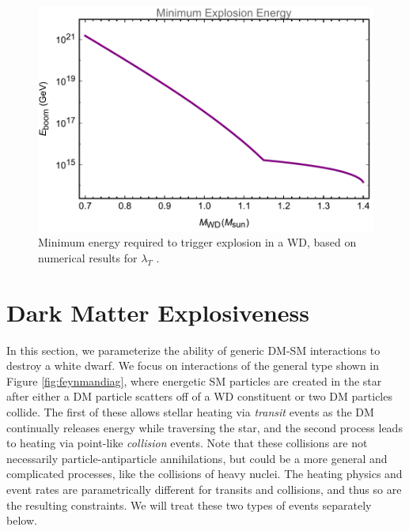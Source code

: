 \documentclass[twocolumn,showpacs,preprintnumbers,amsmath,amssymb,prd]{revtex4}
\begin{document}
\begin{figure}
\includegraphics[scale=.45]{Eboom.pdf}
\caption{Minimum energy required to trigger explosion in a WD, based on numerical results for $\lambda_T$ \cite{Woosley}.}
\label{fig:Eboom}
\end{figure}

\section{Dark Matter Explosiveness}
\label{sec:DMexplode}

In this section, we parameterize the ability of generic DM-SM interactions to destroy a white dwarf.  We focus on interactions of the general type shown in  Figure \ref{fig:feynmandiag}, where energetic SM particles are created in the star after either a DM particle scatters off of a WD constituent or two DM particles collide.  The first of these allows stellar heating via \emph{transit} events as the DM continually releases energy while traversing the star, and the second process leads to heating via point-like \emph{collision} events.  Note that these collisions are not necessarily particle-antiparticle annihilations, but could be a more general and complicated processes, like the collisions of heavy nuclei.  The heating physics and event rates are parametrically different for transits and collisions, and thus so are the resulting constraints. We will treat these two types of events separately below.  
\end{document}
